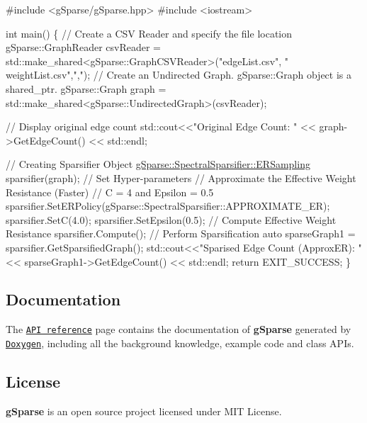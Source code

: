 \begin{DoxyCode}
\textcolor{preprocessor}{#include <gSparse/gSparse.hpp>}
\textcolor{preprocessor}{#include <iostream>}

\textcolor{keywordtype}{int} main()
\{
    \textcolor{comment}{// Create a CSV Reader and specify the file location}
    gSparse::GraphReader csvReader = std::make\_shared<gSparse::GraphCSVReader>(\textcolor{stringliteral}{"edgeList.csv"}, \textcolor{stringliteral}{"
      weightList.csv"},\textcolor{stringliteral}{","});
    \textcolor{comment}{// Create an Undirected Graph. gSparse::Graph object is a shared\_ptr.}
    gSparse::Graph graph = std::make\_shared<gSparse::UndirectedGraph>(csvReader);

    \textcolor{comment}{// Display original edge count}
    std::cout<<\textcolor{stringliteral}{"Original Edge Count: "} << graph->GetEdgeCount() << std::endl;

    \textcolor{comment}{// Creating Sparsifier Object}
    \mbox{\hyperlink{classg_sparse_1_1_spectral_sparsifier_1_1_e_r_sampling}{gSparse::SpectralSparsifier::ERSampling}} sparsifier(graph);
    \textcolor{comment}{// Set Hyper-parameters}
    \textcolor{comment}{// Approximate the Effective Weight Resistance (Faster)}
    \textcolor{comment}{// C = 4 and Epsilon = 0.5}
    sparsifier.SetERPolicy(gSparse::SpectralSparsifier::APPROXIMATE\_ER);
    sparsifier.SetC(4.0);
    sparsifier.SetEpsilon(0.5);
    \textcolor{comment}{// Compute Effective Weight Resistance}
    sparsifier.Compute();
    \textcolor{comment}{// Perform Sparsification }
    \textcolor{keyword}{auto} sparseGraph1 = sparsifier.GetSparsifiedGraph();
    std::cout<<\textcolor{stringliteral}{"Sparised Edge Count (ApproxER): "} << sparseGraph1->GetEdgeCount() << std::endl;
    \textcolor{keywordflow}{return} EXIT\_SUCCESS;
\}
\end{DoxyCode}


\subsection*{Documentation}

The \href{https://codedocs.xyz/As-12/gSparse/}{\tt A\+PI reference} page contains the documentation of {\bfseries g\+Sparse} generated by \href{http://www.doxygen.org/}{\tt Doxygen}, including all the background knowledge, example code and class A\+P\+Is.

\subsection*{License}

{\bfseries g\+Sparse} is an open source project licensed under M\+IT License. 